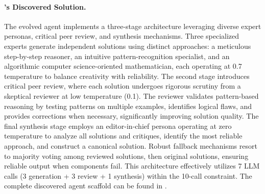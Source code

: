 \paragraph{\ouralgo's Discovered Solution.}
The evolved agent implements a three-stage architecture leveraging diverse expert personas, critical peer review, and synthesis mechanisms.
Three specialized experts generate independent solutions using distinct approaches: a meticulous step-by-step reasoner, an intuitive pattern-recognition specialist, and an algorithmic computer science-oriented mathematician, each operating at 0.7 temperature to balance creativity with reliability.
%
The second stage introduces critical peer review, where each solution undergoes rigorous scrutiny from a skeptical reviewer at low temperature (0.1).
The reviewer validates pattern-based reasoning by testing patterns on multiple examples, identifies logical flaws, and provides corrections when necessary, significantly improving solution quality.
%
The final synthesis stage employs an editor-in-chief persona operating at zero temperature to analyze all solutions and critiques, identify the most reliable approach, and construct a canonical solution.
Robust fallback mechanisms resort to majority voting among reviewed solutions, then original solutions, ensuring reliable output when components fail.
This architecture effectively utilizes 7 LLM calls (3 generation + 3 review + 1 synthesis) within the 10-call constraint.
The complete discovered agent scaffold can be found in .